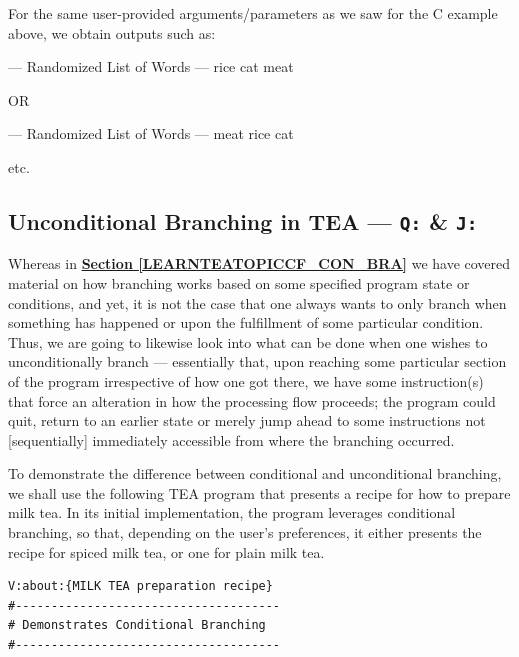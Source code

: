 \documentclass[a4paper, 18pt]{book} %
\begin{document}
{{{\begin{appendices}
For the same user-provided arguments/parameters as we saw for the C example above, we obtain outputs such as:

 \begin{tcbverbatim}
--- Randomized List of Words ---
rice cat meat 
  \end{tcbverbatim}
  
  OR
  
   \begin{tcbverbatim}
--- Randomized List of Words ---
meat rice cat
    \end{tcbverbatim}

etc.


\subsection{Unconditional Branching in TEA --- \texttt{Q:} \& \texttt{J:}}
\label{LEARNTEATOPICCF_UNCON_BRA}


Whereas in \textbf{\hyperref[LEARNTEATOPICCF_CON_BRA]{Section \ref{LEARNTEATOPICCF_CON_BRA}}} we have covered material on how branching works based on some specified program state or conditions, and yet, it is not the case that one always wants to only branch when something has happened or upon the fulfillment of some particular condition. Thus, we are going to likewise look into what can be done when one wishes to unconditionally branch --- essentially that, upon reaching some particular section of the program irrespective of how one got there, we have some instruction(s) that force an alteration in how the processing flow proceeds; the program could quit, return to an earlier state or merely jump ahead to some instructions not [sequentially] immediately accessible from where the branching occurred.

\vspace{2em}

To demonstrate the difference between conditional and unconditional branching, we shall use the following TEA program that presents a recipe for how to prepare milk tea. In its initial implementation, the program leverages conditional branching, so that, depending on the user's preferences, it either presents the recipe for spiced milk tea, or one for plain milk tea.



\vspace{2em}

  \begin{tcolorbox}[teaterminalstyle, title=Conditional Branching in TEA: MILK TEA RECIPE Presenter, breakable]
  \begin{lstlisting}[language=TEA,breaklines=true,]
V:about:{MILK TEA preparation recipe}
#-------------------------------------
# Demonstrates Conditional Branching
#-------------------------------------


\end{lstlisting}
\end{tcolorbox}
\end{appendices}}}}
\end{document}
